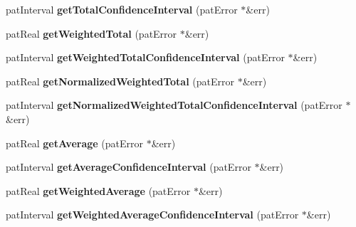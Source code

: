 \begin{DoxyCompactItemize}
\item 
\mbox{\label{classbio_simulated_values_aed7a37aede6610481a99c0e4fce44624}} 
pat\+Interval {\bfseries get\+Total\+Confidence\+Interval} (pat\+Error $\ast$\&err)
\item 
\mbox{\label{classbio_simulated_values_ad6bf2ddb55c85f2af222fbe88a67ad27}} 
pat\+Real {\bfseries get\+Weighted\+Total} (pat\+Error $\ast$\&err)
\item 
\mbox{\label{classbio_simulated_values_afa359deea067b5a7d0872253e67dd627}} 
pat\+Interval {\bfseries get\+Weighted\+Total\+Confidence\+Interval} (pat\+Error $\ast$\&err)
\item 
\mbox{\label{classbio_simulated_values_a9a7892199ecfd7428466277fd9d4e14f}} 
pat\+Real {\bfseries get\+Normalized\+Weighted\+Total} (pat\+Error $\ast$\&err)
\item 
\mbox{\label{classbio_simulated_values_a3143e1351d8a115e5e16feba8bc45a79}} 
pat\+Interval {\bfseries get\+Normalized\+Weighted\+Total\+Confidence\+Interval} (pat\+Error $\ast$\&err)
\item 
\mbox{\label{classbio_simulated_values_a3ce86d773a6641be92b11f5e5bed1590}} 
pat\+Real {\bfseries get\+Average} (pat\+Error $\ast$\&err)
\item 
\mbox{\label{classbio_simulated_values_a8ae97368f20e1036d29bdfa1d503fcbf}} 
pat\+Interval {\bfseries get\+Average\+Confidence\+Interval} (pat\+Error $\ast$\&err)
\item 
\mbox{\label{classbio_simulated_values_af90fadc238a18c3773d6c86454e25898}} 
pat\+Real {\bfseries get\+Weighted\+Average} (pat\+Error $\ast$\&err)
\item 
\mbox{\label{classbio_simulated_values_a73b77a00a2453a86920165e8e069b1d6}} 
pat\+Interval {\bfseries get\+Weighted\+Average\+Confidence\+Interval} (pat\+Error $\ast$\&err)
\item 
\mbox{\label{classbio_simulated_values_ae3926d54c23e6e2d36e0704a3fa673d4}} 

\end{DoxyCompactItemize}
